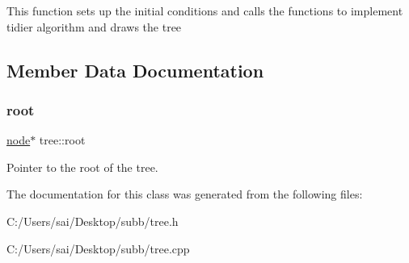 This function sets up the initial conditions and calls the functions to implement tidier algorithm and draws the tree 

\subsection{Member Data Documentation}
\mbox{\label{classtree_ad397d4906e47149b98f769b3e81473ee}} 
\subsubsection{\texorpdfstring{root}{root}}
{\footnotesize\ttfamily \mbox{\hyperlink{structnode}{node}}$\ast$ tree\+::root\hspace{0.3cm}{\ttfamily [private]}}

Pointer to the root of the tree. 

The documentation for this class was generated from the following files\+:\begin{DoxyCompactItemize}
\item 
C\+:/\+Users/sai/\+Desktop/subb/tree.\+h\item 
C\+:/\+Users/sai/\+Desktop/subb/tree.\+cpp\end{DoxyCompactItemize}
